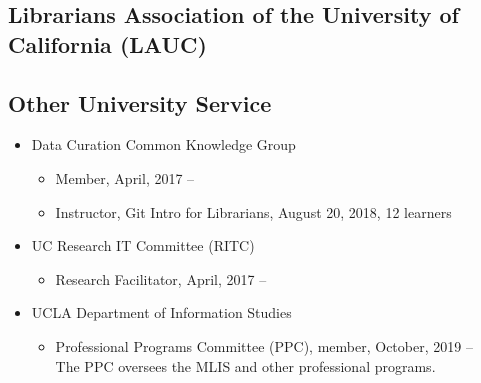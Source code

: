 
\subsection{Librarians Association of the University of California (LAUC)}

\subsection{Other University Service}
\begin{itemize}[label={},leftmargin=!,labelindent=5pt,itemindent=-15pt]
  \item Data Curation Common Knowledge Group
  \begin{itemize}
    \item Member, April, 2017 --
    \item Instructor, Git Intro for Librarians, August 20, 2018, 12 learners
  \end{itemize}
  \item UC Research IT Committee (RITC)
    \begin{itemize}[label={},leftmargin=!,labelindent=5pt,itemindent=-15pt]
      \item Research Facilitator, April, 2017 --
    \end{itemize}
  \item UCLA Department of Information Studies
    \begin{itemize}[label={},leftmargin=!,labelindent=5pt,itemindent=-15pt]
      \item Professional Programs Committee (PPC), member, October, 2019 --  \\ The PPC oversees the MLIS and other professional programs.
    \end{itemize}
\end{itemize}
